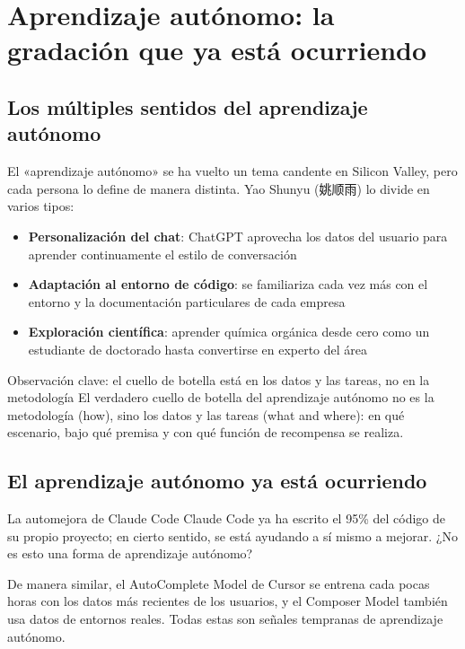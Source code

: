 \section{Aprendizaje autónomo: la gradación que ya está ocurriendo}

\subsection{Los múltiples sentidos del aprendizaje autónomo}

El «aprendizaje autónomo» se ha vuelto un tema candente en Silicon Valley, pero cada persona lo define de manera distinta. Yao Shunyu (姚顺雨) lo divide en varios tipos:

\begin{itemize}
\item \textbf{Personalización del chat}: ChatGPT aprovecha los datos del usuario para aprender continuamente el estilo de conversación
\item \textbf{Adaptación al entorno de código}: se familiariza cada vez más con el entorno y la documentación particulares de cada empresa
\item \textbf{Exploración científica}: aprender química orgánica desde cero como un estudiante de doctorado hasta convertirse en experto del área
\end{itemize}

\begin{importantbox}{Observación clave: el cuello de botella está en los datos y las tareas, no en la metodología}
El verdadero cuello de botella del aprendizaje autónomo no es la metodología (how), sino los datos y las tareas (what and where): en qué escenario, bajo qué premisa y con qué función de recompensa se realiza.
\end{importantbox}

\subsection{El aprendizaje autónomo ya está ocurriendo}

\begin{knowledgebox}{La automejora de Claude Code}
Claude Code ya ha escrito el 95\% del código de su propio proyecto; en cierto sentido, se está ayudando a sí mismo a mejorar. ¿No es esto una forma de aprendizaje autónomo?

De manera similar, el AutoComplete Model de Cursor se entrena cada pocas horas con los datos más recientes de los usuarios, y el Composer Model también usa datos de entornos reales. Todas estas son señales tempranas de aprendizaje autónomo.
\end{knowledgebox}


